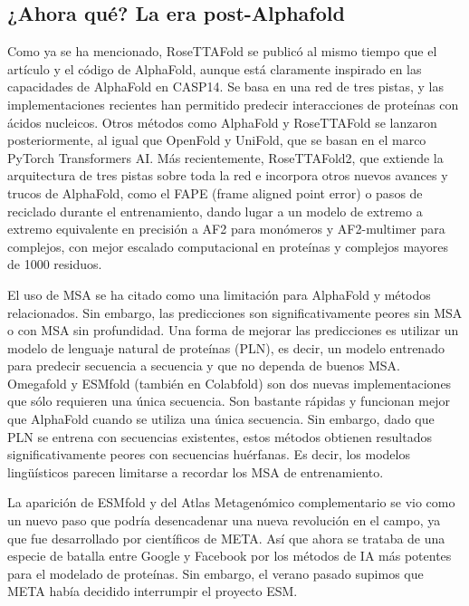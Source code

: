 \subsection{¿Ahora qué? La era post-Alphafold}
Como ya se ha mencionado, RoseTTAFold se publicó al mismo tiempo que el artículo y el código de AlphaFold, aunque está claramente inspirado en las capacidades de AlphaFold en CASP14. Se basa en una red de tres pistas, y las implementaciones recientes han permitido predecir interacciones de proteínas con ácidos nucleicos. Otros métodos como AlphaFold y RoseTTAFold se lanzaron posteriormente, al igual que OpenFold y UniFold, que se basan en el marco PyTorch Transformers AI. Más recientemente, RoseTTAFold2, que extiende la arquitectura de tres pistas sobre toda la red e incorpora otros nuevos avances y trucos de AlphaFold, como el FAPE (frame aligned point error) o pasos de reciclado durante el entrenamiento, dando lugar a un modelo de extremo a extremo equivalente en precisión a AF2 para monómeros y AF2-multimer para complejos, con mejor escalado computacional en proteínas y complejos mayores de 1000 residuos.

El uso de MSA se ha citado como una limitación para AlphaFold y métodos relacionados. Sin embargo, las predicciones son significativamente peores sin MSA o con MSA sin profundidad. Una forma de mejorar las predicciones es utilizar un modelo de lenguaje natural de proteínas (PLN), es decir, un modelo entrenado para predecir secuencia a secuencia y que no dependa de buenos MSA. Omegafold y ESMfold (también en Colabfold) son dos nuevas implementaciones que sólo requieren una única secuencia. Son bastante rápidas y funcionan mejor que AlphaFold cuando se utiliza una única secuencia. Sin embargo, dado que PLN se entrena con secuencias existentes, estos métodos obtienen resultados significativamente peores con secuencias huérfanas. Es decir, los modelos lingüísticos parecen limitarse a recordar los MSA de entrenamiento.

La aparición de ESMfold y del Atlas Metagenómico complementario se vio como un nuevo paso que podría desencadenar una nueva revolución en el campo, ya que fue desarrollado por científicos de META. Así que ahora se trataba de una especie de batalla entre Google y Facebook por los métodos de IA más potentes para el modelado de proteínas. Sin embargo, el verano pasado supimos que META había decidido interrumpir el proyecto ESM.

